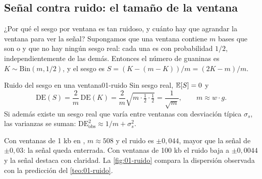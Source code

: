 \subsection{Señal contra ruido: el tamaño de la ventana}

¿Por qué el sesgo por ventana es tan ruidoso, y cuánto hay que agrandar la ventana para ver la señal? Supongamos que una ventana contiene $m$ bases que son  o  y que no hay ningún sesgo real: cada una es  con probabilidad $1/2$, independientemente de las demás. Entonces el número de guaninas es $K\sim\mathrm{Bin}(m,1/2)$, y el sesgo es $S=(K-(m-K))/m = (2K-m)/m$.

\begin{teorema}{Ruido del sesgo en una ventana}{01-ruido}
Sin sesgo real, $\mathbb{E}[S]=0$ y
\begin{equation}\label{eq:01-ruido}
\mathrm{DE}(S) = \frac{2}{m}\,\mathrm{DE}(K) = \frac{2}{m}\sqrt{m\cdot\tfrac12\cdot\tfrac12} = \frac{1}{\sqrt{m}},
\qquad m\approx w\cdot g .
\end{equation}
Si además existe un sesgo real que varía entre ventanas con desviación típica $\sigma_s$, las varianzas se suman: $\mathrm{DE}_{\text{obs}}^2\approx 1/m + \sigma_s^2$.
\end{teorema}

\begin{simbolos}
\end{simbolos}

Con ventanas de 1 kb en , $m\approx508$ y el ruido es $\pm0{,}044$, mayor que la señal de $\pm0{,}03$: la señal queda enterrada. Con ventanas de 100 kb el ruido baja a $\pm0{,}0044$ y la señal destaca con claridad. La \cref{fig:01-ruido} compara la dispersión observada con la predicción del \cref{teo:01-ruido}.

